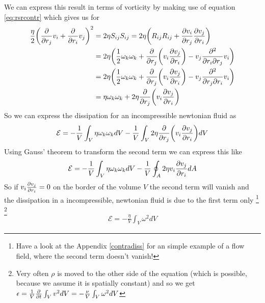 We can express this result in terms of vorticity by making use of 
equation \eqref{eq:rsrcontr} which gives us for
\begin{align*}
\frac{\eta}{2}\lra{\pd{r_j}v_i+\pd{r_i}v_j}^2
&= 2 \eta S_{ij} S_{ij}
= 2 \eta \lra{R_{ij} R_{ij} + \ppd{r_j}{v_i}\ppd{r_i}{v_j}}\\
&= 2 \eta \lra{\frac{1}{2} \omega_k \omega_k 
+ \pd{r_j}\lra{v_i \ppd{r_i}{v_j}} 
- v_j \frac{\partial^2}{\partial r_i \partial r_j} v_i}\\
&= 2 \eta \lra{\frac{1}{2} \omega_k \omega_k 
+ \pd{r_j}\lra{v_i \ppd{r_i}{v_j}} 
- v_j \frac{\partial^2}{\partial r_j \partial r_i} v_i}\\ 
 &= \eta \omega_k \omega_k + 2 \eta \pd{r_j}\lra{v_i \ppd{r_i}{v_j}}
\end{align*}
So we can express the dissipation for an incompressible newtonian fluid as
\begin{align}
\mathcal{E} = 
-\frac{1}{V} \int_V \eta \omega_k \omega_k dV
-\frac{1}{V} \int_V 
2 \eta \pd{r_j}\lra{v_i \ppd{r_i}{v_j}} dV \label{eq:nicdissfull}
\end{align}
Using Gauss' theorem to transform the second term we can express this like
\begin{align*}
\mathcal{E} = 
-\frac{1}{V} \int_V \eta \omega_k \omega_k dV
-\frac{1}{V} \oint_A 
2 \eta v_i \ppd{r_i}{v_j} dA
\end{align*}
So if $v_i \ppd{r_i}{v_j}=0$ on the border of the volume $V$ the second term 
will vanish
and the dissipation in a incompressible, newtonian fluid is 
due to the first term only \footnote{Have a look at the Appendix
\ref{contradiss} for an simple example of a flow field, where the second term 
doesn't
vanish!}
\footnote{Very often $\rho$ is moved to the other side of the equation (which is 
possible, because we assume it is spatially constant) and so we get 
$\epsilon = \frac{1}{V}\pd{t}\int_V v^2 dV = -\frac{\nu}{V} \int_V \omega^2 dV$}
 \begin{align}
\mathcal{E} = -\frac{\eta}{V} \int_V \omega^2 dV \label{eq:nicdissvort}
\end{align}
